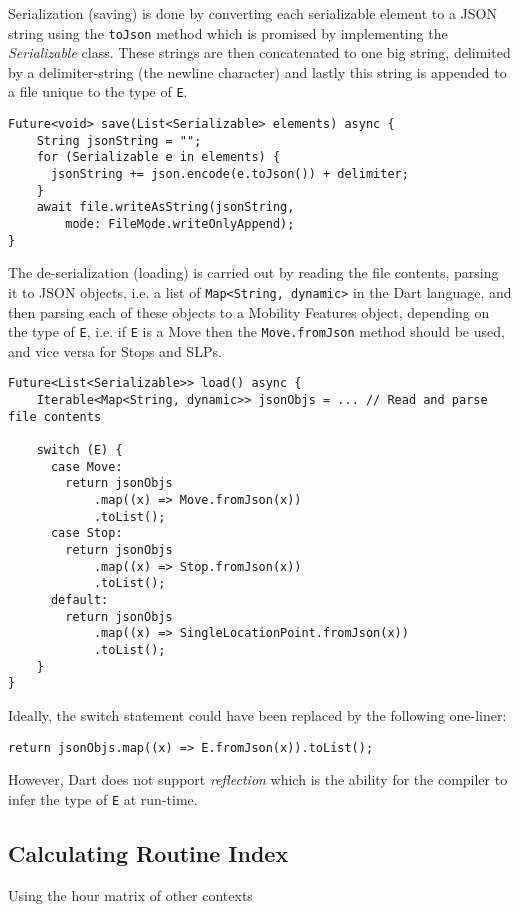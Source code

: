 Serialization (saving) is done by converting each serializable element to a JSON string using the \verb|toJson| method which is promised by implementing the \textit{Serializable} class. These strings are then concatenated to one big string, delimited by a delimiter-string (the newline character) and lastly this string is appended to a file unique to the type of \verb|E|.

\begin{verbatim}
Future<void> save(List<Serializable> elements) async {
    String jsonString = "";
    for (Serializable e in elements) {
      jsonString += json.encode(e.toJson()) + delimiter;
    }
    await file.writeAsString(jsonString, 
        mode: FileMode.writeOnlyAppend);
}
\end{verbatim}

The de-serialization (loading) is carried out by reading the file contents, parsing it to JSON objects, i.e. a list of \verb|Map<String, dynamic>| in the Dart language, and then parsing each of these objects to a Mobility Features object, depending on the type of \verb|E|, i.e. if \verb|E| is a Move then the \verb|Move.fromJson| method should be used, and vice versa for Stops and SLPs. 

\begin{verbatim}
Future<List<Serializable>> load() async {
    Iterable<Map<String, dynamic>> jsonObjs = ... // Read and parse file contents
    
    switch (E) {
      case Move:
        return jsonObjs
            .map((x) => Move.fromJson(x))
            .toList();
      case Stop:
        return jsonObjs
            .map((x) => Stop.fromJson(x))
            .toList();
      default:
        return jsonObjs
            .map((x) => SingleLocationPoint.fromJson(x))
            .toList();
    }
}
\end{verbatim}

Ideally, the switch statement could have been replaced by the following one-liner:
\begin{verbatim}
return jsonObjs.map((x) => E.fromJson(x)).toList();
\end{verbatim}

However, Dart does not support \textit{reflection} which is the ability for the compiler to infer the type of \verb|E| at run-time.

\subsection{Calculating Routine Index}
Using the hour matrix of other contexts